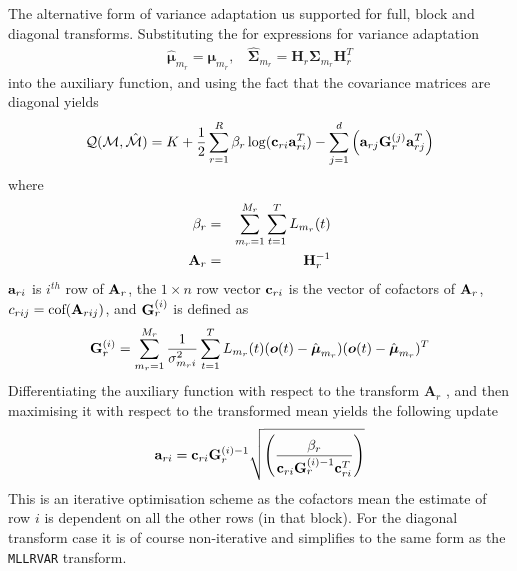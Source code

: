 The alternative form of variance adaptation us supported for full,
block and diagonal transforms. Substituting the for expressions for
variance adaptation
\begin{eqnarray}
\hat{\bm{\mu}}_{m_r} = \bm{\mu}_{m_r}, \:\:\:\: 
\hat{\bm{\Sigma}}_{m_r} = {\bm H}_r{\bm{\Sigma}}_{m_r}{\bm H}_r^T
\end{eqnarray}
into the auxiliary function, and using the fact that the covariance
matrices are diagonal yields
\begin{eqnarray}
{\cal Q}({\cal M},{\hat{\cal M}}) = K + 
\frac{1}{2}
\sum_{r=1}^R
\beta_r\log({\bf c}_{ri}{\bf a}_{ri}^T)-
\sum_{j=1}^d{
\left({\bf a}_{rj}{\bf G}^{(j)}_r{\bf a}^T_{rj}
\right)} \nonumber
\end{eqnarray}
where 
\begin{eqnarray}
\beta_r &=& \sum_{m_r=1}^{M_r}\sum_{t=1}^TL_{m_r}(t)\\
{\bf A}_r &=& {\bf H}_r^{-1}
\end{eqnarray}
${\bf a}_{ri}$ is $i^{th}$ row of ${\bf
A}_r$, the $1\times n$ row vector ${\bf c}_{ri}$ is the vector of
cofactors of ${\bf A}_r$, $c_{rij}={\mbox{cof}}({\bf A}_{rij})$,
and  ${\bf G}^{(i)}_r$ is defined as
\begin{eqnarray}
{\bf G}^{(i)}_r=\sum_{m_r=1}^{M_r}
\frac{1}{\sigma_{m_ri}^{2}}
\sum_{t=1}^TL_{m_r}(t)({\mbox{\boldmath $o$}}(t)-\hat{{\mbox{\boldmath $\mu$}}}_{m_r})
({\mbox{\boldmath $o$}}(t)-\hat{{\mbox{\boldmath $\mu$}}}_{m_r})^T
\label{eq:gi_mllr2}
\end{eqnarray}
Differentiating the auxiliary function with respect to the transform
${\bm A}_r$ , and then maximising it with respect to the transformed mean
yields the following update
\begin{eqnarray}
{\bf a}_{ri} ={\bf c}_{ri}{\bf G}^{(i)-1}_r
\sqrt{\left(\frac{\beta_r}{{\bf
c}_{ri}{\bf G}_r^{(i)-1}{\bf c}^T_{ri}}\right)}
\end{eqnarray}
This is an iterative optimisation scheme as the cofactors mean the estimate
of row $i$ is dependent on all the other rows (in that block). For the 
diagonal transform case it is of course non-iterative and simplifies to
the same form as the {\tt MLLRVAR} transform.


